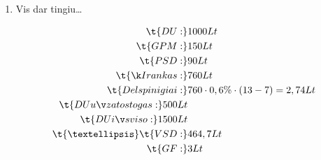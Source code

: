 \begin{enumerate}
  \item Vis dar tingiu…

    \begin{align*}
      \t{DU:} & 1000 Lt \\
      \t{GPM:} & 150 Lt \\
      \t{PSD:} & 90 Lt \\
      \t{Į rankas:} & 760 Lt \\
      \t{Delspinigiai:} & 760 \cdot 0,6 \% \cdot (13 - 7) = 2,74 Lt \\
      \t{DU už atostogas:} 500 Lt \\
      \t{DU iš viso:} 1500 Lt \\
      \t{…}
      \t{VSD:} & 464,7 Lt \\
      \t{GF:} & 3 Lt \\
    \end{align*}

\end{enumerate}
